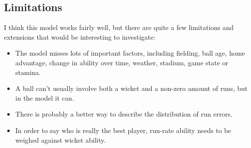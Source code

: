 \documentclass[11pt]{article}
\begin{document}
\subsection*{Limitations}
\label{sec:org714200c}
I think this model works fairly well, but there are quite a few
limitations and extensions that would be interesting to investigate:

\begin{itemize}
\item The model misses lots of important factors, including fielding, ball age,
home advantage, change in ability over time, weather, stadium, game
state or stamina.
\item A ball can't usually involve both a wicket and a non-zero amount of
runs, but in the model it can.
\item There is probably a better way to describe the distribution of run
errors.
\item In order to say who is really the best player, run-rate ability
needs to be weighed against wicket ability.
\end{itemize}
\end{document}

